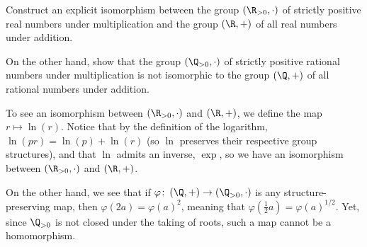 \documentclass[10pt]{mypackage}
\begin{document}
\begin{problem}[Problem 8]
  Construct an explicit isomorphism between the group $\left( \R_{> 0},\cdot \right)$ of strictly positive real numbers under multiplication and the group $\left( \R,+ \right)$ of all real numbers under addition.\newline

  On the other hand, show that the group $\left( \Q_{ > 0 },\cdot \right)$ of strictly positive rational numbers under multiplication is not isomorphic to the group $\left( \Q,+ \right)$ of all rational numbers under addition.
\end{problem}
\begin{solution}
  To see an isomorphism between $\left( \R_{ > 0 },\cdot \right)$ and $\left( \R,+ \right)$, we define the map $r\mapsto \ln\left( r \right)$. Notice that by the definition of the logarithm, $\ln\left( pr \right) = \ln\left( p \right) + \ln\left( r \right)$ (so $\ln$ preserves their respective group structures), and that $\ln$ admits an inverse, $\exp$, so we have an isomorphism between $\left( \R_{ > 0 },\cdot \right)$ and $\left( \R,+ \right)$.\newline

  On the other hand, we see that if $\varphi\colon \left( \Q,+ \right)\rightarrow \left( \Q_{> 0},\cdot \right)$ is any structure-preserving map, then $\varphi\left( 2a \right) = \varphi\left( a \right)^2$, meaning that $\varphi\left( \frac{1}{2}a \right) = \varphi\left( a \right)^{1/2}$. Yet, since $\Q_{> 0}$ is not closed under the taking of roots, such a map cannot be a homomorphism.
\end{solution}
\end{document}
